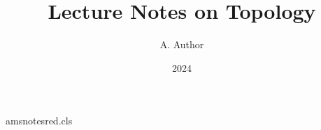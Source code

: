 \begin{filecontents*}[overwrite]{amsnotesred.cls}
\newcommand\course[1]{\gdef\@course{#1}}
\renewcommand\maketitle{%
  \begin{center}
    {\LARGE \@title \par}
    {\large Course: \@course \par}
  \end{center}\par
  \@setcopyright}
\end{filecontents*}
\documentclass{amsnotesred}
\title{Lecture Notes on Topology}
\author{A. Author}
\date{2024}

\maketitle
Text.

